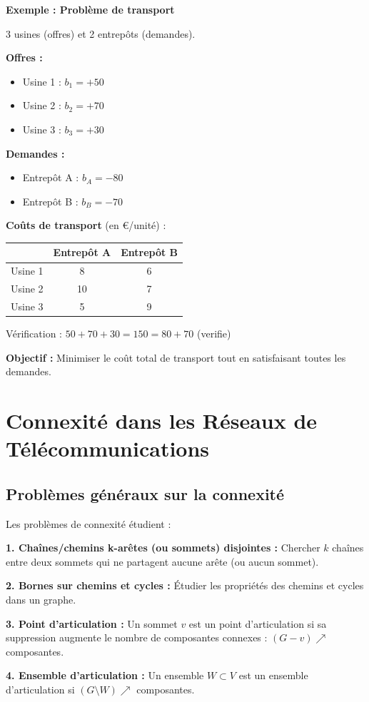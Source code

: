 \documentclass[12pt,a4paper]{article}
\begin{document}
\begin{exemple}
\textbf{Exemple : Problème de transport}

3 usines (offres) et 2 entrepôts (demandes).

\textbf{Offres :}
\begin{itemize}
    \item Usine 1 : $b_1 = +50$
    \item Usine 2 : $b_2 = +70$
    \item Usine 3 : $b_3 = +30$
\end{itemize}

\textbf{Demandes :}
\begin{itemize}
    \item Entrepôt A : $b_A = -80$
    \item Entrepôt B : $b_B = -70$
\end{itemize}

\textbf{Coûts de transport} (en €/unité) :
\begin{center}
\begin{tabular}{|c|c|c|}
\hline
 & Entrepôt A & Entrepôt B \\
\hline
Usine 1 & 8 & 6 \\
Usine 2 & 10 & 7 \\
Usine 3 & 5 & 9 \\
\hline
\end{tabular}
\end{center}

Vérification : $50 + 70 + 30 = 150 = 80 + 70$ (verifie)

\textbf{Objectif :} Minimiser le coût total de transport tout en satisfaisant toutes les demandes.
\end{exemple}

\newpage
\section{Connexité dans les Réseaux de Télécommunications}

\subsection{Problèmes généraux sur la connexité}

\begin{definition}
Les problèmes de connexité étudient :

\textbf{1. Chaînes/chemins k-arêtes (ou sommets) disjointes :}
Chercher $k$ chaînes entre deux sommets qui ne partagent aucune arête (ou aucun sommet).

\textbf{2. Bornes sur chemins et cycles :}
Étudier les propriétés des chemins et cycles dans un graphe.

\textbf{3. Point d'articulation :}
Un sommet $v$ est un point d'articulation si sa suppression augmente le nombre de composantes connexes : $(G - v) \nearrow$ composantes.

\textbf{4. Ensemble d'articulation :}
Un ensemble $W \subset V$ est un ensemble d'articulation si $(G \setminus W) \nearrow$ composantes.
\end{definition}
\end{document}

